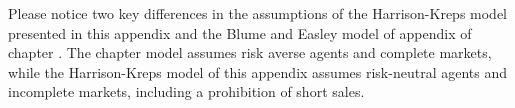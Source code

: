 Please notice two 
key differences in the assumptions of the Harrison-Kreps model presented in this appendix and the Blume and Easley model of appendix  of chapter .
The chapter  model assumes risk averse agents
and complete markets, while
the  Harrison-Kreps model of this appendix assumes 
risk-neutral agents and incomplete markets, including
a prohibition of short sales.  

